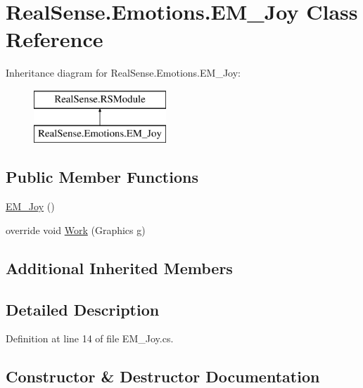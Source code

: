 \hypertarget{class_real_sense_1_1_emotions_1_1_e_m___joy}{}\section{Real\+Sense.\+Emotions.\+E\+M\+\_\+\+Joy Class Reference}
\label{class_real_sense_1_1_emotions_1_1_e_m___joy}
Inheritance diagram for Real\+Sense.\+Emotions.\+E\+M\+\_\+\+Joy\+:\begin{figure}[H]
\begin{center}
\leavevmode
\includegraphics[height=2.000000cm]{class_real_sense_1_1_emotions_1_1_e_m___joy}
\end{center}
\end{figure}
\subsection*{Public Member Functions}
\begin{DoxyCompactItemize}
\item 
\hyperlink{class_real_sense_1_1_emotions_1_1_e_m___joy_a1e37185e1aadd7a6e9c38414b5eb22fe}{E\+M\+\_\+\+Joy} ()
\item 
override void \hyperlink{class_real_sense_1_1_emotions_1_1_e_m___joy_acce5a4daa0acfd1a10d0aac92ef278c8}{Work} (Graphics g)
\end{DoxyCompactItemize}
\subsection*{Additional Inherited Members}


\subsection{Detailed Description}


Definition at line 14 of file E\+M\+\_\+\+Joy.\+cs.



\subsection{Constructor \& Destructor Documentation}
\mbox{\label{class_real_sense_1_1_emotions_1_1_e_m___joy_a1e37185e1aadd7a6e9c38414b5eb22fe}} 
